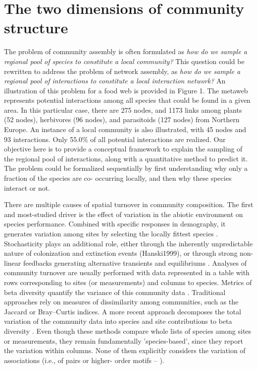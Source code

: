 \documentclass[12pt]{article}
\begin{document}
\section*{The two dimensions of community structure}

The problem of community assembly is often formulated as \textit{how do we
sample a regional pool of species to constitute a local community?} This
question could be rewritten to address the problem of network assembly, as
\textit{how do we sample a regional pool of interactions to constitute a local
interaction network?} An illustration of this problem for a food web is
provided in Figure 1. The metaweb represents potential interactions among all
species that could be found in a given area. In this particular case, there
are 275 nodes, and 1173 links among plants (52 nodes), herbivores (96 nodes),
and parasitoids (127 nodes) from Northern Europe. An instance of a local
community is also illustrated, with 45 nodes and 93 interactions. Only 55.0\%
of all potential interactions are realized. Our objective here is to provide a
conceptual framework to explain the sampling of the regional pool of
interactions, along with a quantitative method to predict it. The problem
could be formalized sequentially by first understanding why only a fraction of
the species are co- occurring locally, and then why these species interact or
not.

There are multiple causes of spatial turnover in community composition. The
first and most-studied driver is the effect of variation in the abiotic
environment on species performance. Combined with specific responses in
demography, it generates variation among sites by selecting the locally
fittest species \citep{Leibold2004}. Stochasticity plays an additional role,
either through the inherently unpredictable nature of colonization and
extinction events (Hanski1999), or through strong non-linear feedbacks
generating alternative transients and equilibriums \citep{Chase2007,
Vellend2014}. Analyses of community turnover are usually performed with data
represented in a table with rows corresponding to sites (or measurements) and
columns to species. Metrics of beta diversity quantify the variance of this
community data \citep{Legendre2005}. Traditional approaches rely on measures
of dissimilarity among communities, such as the Jaccard or Bray–Curtis
indices. A more recent approach decomposes the total variation of the
community data into species and site contributions to beta diversity
\citep{Legendre2013}. Even though these methods compare whole lists of species
among sites or measurements, they remain fundamentally ’species-based’, since
they report the variation within columns. None of them explicitly considers
the variation of associations (i.e., of pairs or higher- order motifs –
\citealt{Stouffer2007}).
\end{document}
